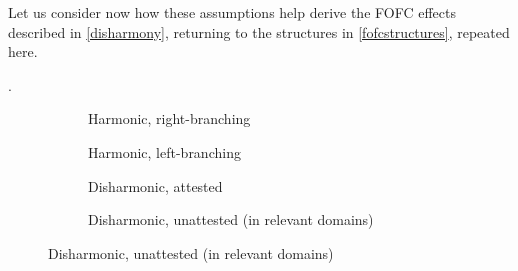 \documentclass[output=paper]{langscibook}
\begin{document}
	Let us consider now how these assumptions help derive the FOFC effects described in \protect\ref{disharmony}, returning to the structures in \protect\ref{fofcstructures}, repeated here.
	
\pagebreak
{\ex.{}\nopagebreak

\vspace*{-1cm}\nopagebreak\begin{figure}[h!]
\begin{subfigure}{.25\textwidth}
  \caption{Harmonic, right-branching}
  \label{fig:sub1}
\end{subfigure}\hfill
\begin{subfigure}{.25\textwidth}
  \caption{Harmonic, left-branching}
  \label{fig:sub2}
\end{subfigure}\hfill
\begin{subfigure}{.25\textwidth}
  \caption{Disharmonic, attested}
  \label{fig:sub1}
\end{subfigure}\hfill
\begin{subfigure}{.22\textwidth}
{}
  \caption{Disharmonic, unattested (in relevant domains)}
  \label{fig:sub2}
\end{subfigure}%
\end{figure}

}
\end{document}
